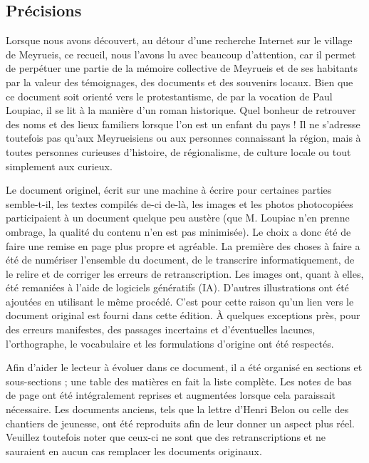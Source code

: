

\subsection{Précisions}

Lorsque nous avons découvert, au détour d'une recherche Internet sur le village de Meyrueis, ce recueil, nous l'avons lu avec beaucoup d'attention, car il permet de perpétuer une partie de la mémoire collective de Meyrueis et de ses habitants par la valeur des témoignages, des documents et des souvenirs locaux. Bien que ce document soit orienté vers le protestantisme, de par la vocation de Paul Loupiac, il se lit à la manière d'un roman historique. Quel bonheur de retrouver des noms et des lieux familiers lorsque l'on est un enfant du pays ! Il ne s'adresse toutefois pas qu'aux Meyrueisiens ou aux personnes connaissant la région, mais à toutes personnes curieuses d'histoire, de régionalisme, de culture locale ou tout simplement aux curieux.

Le document originel, écrit sur une machine à écrire pour certaines parties semble-t-il, les textes compilés de-ci de-là, les images et les photos photocopiées participaient à un document quelque peu austère (que M. Loupiac n'en prenne ombrage, la qualité du contenu n'en est pas minimisée). Le choix a donc été de faire une remise en page plus propre et agréable. La première des choses à faire a été de numériser l'ensemble du document, de le transcrire informatiquement, de le relire et de corriger les erreurs de retranscription. Les images ont, quant à elles, été remaniées à l'aide de logiciels génératifs (IA). D'autres illustrations ont été ajoutées en utilisant le même procédé. C'est pour cette raison qu'un lien vers le document original est fourni dans cette édition. À quelques exceptions près, pour des erreurs manifestes, des passages incertains et d'éventuelles lacunes, l'orthographe, le vocabulaire et les formulations d'origine ont été respectés.

Afin d'aider le lecteur à évoluer dans ce document, il a été organisé en sections et sous-sections ; une table des matières en fait la liste complète. Les notes de bas de page ont été intégralement reprises et augmentées lorsque cela paraissait nécessaire. Les documents anciens, tels que la lettre d'Henri Belon ou celle des chantiers de jeunesse, ont été reproduits afin de leur donner un aspect plus réel. Veuillez toutefois noter que ceux-ci ne sont que des retranscriptions et ne sauraient en aucun cas remplacer les documents originaux.

